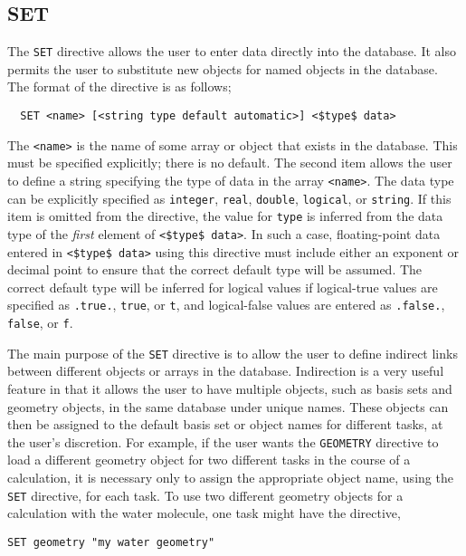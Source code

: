 \subsection{SET}
\label{sec:set}

The \verb+SET+ directive allows the user to enter data directly into the
database.  It also permits the user to substitute new objects for named
objects in the database.  The format of the directive is
as follows;

\begin{verbatim}
  SET <name> [<string type default automatic>] <$type$ data>
\end{verbatim}

The \verb+<name>+ is the name of some array or object that exists in
the database.  This must be specified explicitly; there is no default.
The second item allows the user to define a string specifying the type
of data in the array \verb+<name>+.  The data type can be explicitly 
specified as \verb+integer+,
\verb+real+, \verb+double+, \verb+logical+, or \verb+string+.  If
this item is omitted from the directive, the value for \verb+type+ is
inferred from the data type of the {\em first} element of
\verb+<$type$ data>+.  In such a case, floating-point data entered in 
\verb+<$type$ data>+ using this directive must include either an 
exponent or decimal point to ensure that the correct default type will 
be assumed.  The correct default type will be inferred for logical values 
if logical-true values are specified as \verb+.true.+, \verb+true+, or
\verb+t+, and logical-false values are entered as \verb+.false.+, 
\verb+false+, or \verb+f+.

The main purpose of the \verb+SET+ directive is to allow the user to
define indirect links between different objects or arrays in the database.  
Indirection is a very useful 
feature in that it allows the user to have multiple objects, such as
basis sets and geometry objects, in the same database under unique 
names.  These objects can then be assigned to the default basis set or 
object names for different tasks, at the
user's discretion.  For example, if the user wants the \verb+GEOMETRY+
directive to load a different geometry object for two different tasks in
the course of a calculation, it is necessary only to assign the appropriate
object name, using the \verb+SET+ directive, for each task.  To use two 
different geometry objects for a calculation with the water molecule, one
task might have the directive,

\begin{verbatim}
SET geometry "my water geometry"
\end{verbatim}

